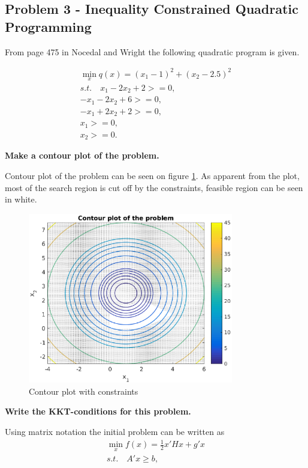 
\newpage
\subsection{Problem 3 - Inequality Constrained Quadratic Programming}
From page 475 in Nocedal and Wright the following quadratic program is given.

\begin{equation}
\begin{aligned}
    \min_{x} q(x) = (x_1-1)^2+(x_2-2.5)^2 \\
    s.t. \quad x_1-2x_2+2> = 0,\\
    -x_1-2x_2+6>=0,\\
    -x_1+2x_2+2>=0,\\
    x_1>=0,\\
    x_2>=0.
\end{aligned}
\end{equation}


\textbf{Make a contour plot of the problem.}

Contour plot of the problem can be seen on figure \ref{fig:3_1}. As apparent from the plot, most of the search region is cut off by the constraints, feasible region can be seen in white.


\begin{figure}
    \centering
    \includegraphics[width = 0.8\textwidth]{fig_3_1.eps}
    \caption{Contour plot with constraints}
    \label{fig:3_1}
\end{figure}


\textbf{Write the KKT-conditions for this problem.}

Using matrix notation the initial problem can be written as
\begin{equation}
\begin{aligned}
    \min_{x} f(x) = \frac{1}{2} x'Hx + g'x  \\
    s.t. \quad A'x \geq b, \\
\end{aligned}
\end{equation}

